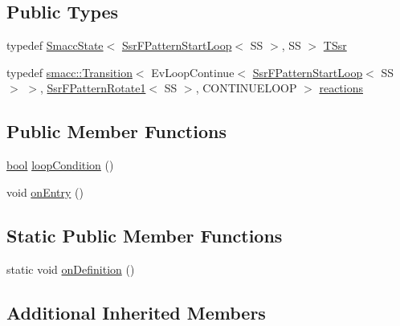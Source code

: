 \subsection*{Public Types}
\begin{DoxyCompactItemize}
\item 
typedef \hyperlink{classSmaccState}{Smacc\+State}$<$ \hyperlink{structsm__dance__bot_1_1f__pattern__states_1_1SsrFPatternStartLoop}{Ssr\+F\+Pattern\+Start\+Loop}$<$ SS $>$, SS $>$ \hyperlink{structsm__dance__bot_1_1f__pattern__states_1_1SsrFPatternStartLoop_ae3ba0c0792cdf3d4e1358530671ed25f}{T\+Ssr}
\item 
typedef \hyperlink{classsmacc_1_1Transition}{smacc\+::\+Transition}$<$ Ev\+Loop\+Continue$<$ \hyperlink{structsm__dance__bot_1_1f__pattern__states_1_1SsrFPatternStartLoop}{Ssr\+F\+Pattern\+Start\+Loop}$<$ SS $>$ $>$, \hyperlink{structsm__dance__bot_1_1f__pattern__states_1_1SsrFPatternRotate1}{Ssr\+F\+Pattern\+Rotate1}$<$ SS $>$, C\+O\+N\+T\+I\+N\+U\+E\+L\+O\+OP $>$ \hyperlink{structsm__dance__bot_1_1f__pattern__states_1_1SsrFPatternStartLoop_ac7825f9e016087f83615e31fa7bdf9cd}{reactions}
\end{DoxyCompactItemize}
\subsection*{Public Member Functions}
\begin{DoxyCompactItemize}
\item 
\hyperlink{classbool}{bool} \hyperlink{structsm__dance__bot_1_1f__pattern__states_1_1SsrFPatternStartLoop_aa8a37c27ee62e7d831acf0a6ffd5ba97}{loop\+Condition} ()
\item 
void \hyperlink{structsm__dance__bot_1_1f__pattern__states_1_1SsrFPatternStartLoop_aea0afd3185d36394155ab34d39215e70}{on\+Entry} ()
\end{DoxyCompactItemize}
\subsection*{Static Public Member Functions}
\begin{DoxyCompactItemize}
\item 
static void \hyperlink{structsm__dance__bot_1_1f__pattern__states_1_1SsrFPatternStartLoop_ad69b8152f8edff5cedd1a6c44acc2711}{on\+Definition} ()
\end{DoxyCompactItemize}
\subsection*{Additional Inherited Members}


